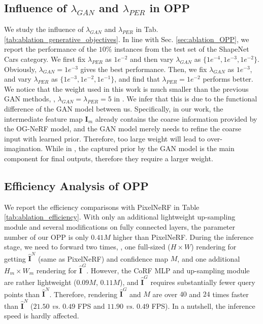 


\subsection{Influence of $\lambda_{GAN}$ and $\lambda_{PER}$ in OPP}

We study the influence of $\lambda_{GAN}$ and $\lambda_{PER}$ in Tab. \ref{tab:ablation_generative_objectives}. In line with Sec. \ref{sec:ablation_OPP}, we report the performance of the $10\%$ instances from the test set of the ShapeNet Cars category. We first fix $\lambda_{PER}$ as $1e^{-2}$ and then vary $\lambda_{GAN}$ as $\{1e^{-4}, 1e^{-3}, 1e^{-2}\}$. Obviously, $\lambda_{GAN} = 1e^{-3}$ gives the best performance. Then, we fix $\lambda_{GAN}$ as $1e^{-3}$, and vary $\lambda_{PER}$ as $\{1e^{-3}, 1e^{-2}, 1e^{-1}\}$, and find that $\lambda_{PER} = 1e^{-2}$ performs better.  We notice that the weight used in this work is much smaller than the previous GAN methods, \eg, $\lambda_{GAN}=\lambda_{PER}=5$ in \cite{Pix2NeRF_cai2022pix2nerf}. We infer that this is due to the functional difference of the GAN model between us. Specifically, in our work, the intermediate feature map $\textbf{I}_m$ already contains the coarse information provided by the OG-NeRF model, and the GAN model merely needs to refine the coarse input with learned prior. Therefore, too large weight will lead to over-imagination. While in \cite{Pix2NeRF_cai2022pix2nerf}, the captured prior by the GAN model is the main component for final outputs, therefore they require a larger weight.


\subsection{Efficiency Analysis of OPP}

\label{Sec:efficiency}
We report the efficiency comparisons with PixelNeRF in Table \ref{tab:ablation_efficiency}. With only an additional lightweight up-sampling module and several modifications on fully connected layers, the parameter number of our OPP is only $0.41M$ higher than PixelNeRF. During the inference stage, we need to forward two times, \ie, one full-sized ($H \times W$) rendering for getting $\hat{\textbf{I}}^{N}$ (same as PixelNeRF) and confidence map $M$, and one additional $H_m \times W_m$ rendering for $\hat{\textbf{I}}^{G}$. However, the CoRF MLP and up-sampling module are rather lightweight ($0.09M$, $0.11M$), and  $\hat{\textbf{I}}^{G}$ requires substantially fewer query points than $\hat{\textbf{I}}^N$. Therefore, rendering $\hat{\textbf{I}}^{G}$ and $M$ are over $40$ and $24$ times faster than $\hat{\textbf{I}}^{N}$ ($21.50$ \textit{vs.} $0.49$ FPS and $11.90$ \textit{vs.} $0.49$ FPS). In a nutshell, the inference speed is hardly affected.


